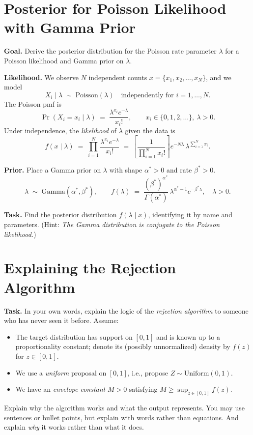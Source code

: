 \documentclass[12pt]{article}
\begin{document}
\section*{Posterior for Poisson Likelihood with Gamma Prior}

\textbf{Goal.} Derive the posterior distribution for the Poisson rate parameter $\lambda$ for a Poisson likelihood and Gamma prior on $\lambda$.

\textbf{Likelihood.} We observe $N$ independent counts $x = \{x_1, x_2, \dots, x_N\}$, and we model
\[
X_i \mid \lambda \;\sim\; \text{Poisson}(\lambda)\quad\text{independently for }i=1,\dots,N.
\]
The Poisson pmf is
\[
\Pr(X_i = x_i \mid \lambda) \;=\; \frac{\lambda^{x_i} e^{-\lambda}}{x_i!},\qquad x_i \in \{0,1,2,\dots\},\ \lambda>0.
\]
Under independence, the \emph{likelihood} of $\lambda$ given the data is
\[
f(x \mid \lambda)\;=\;\prod_{i=1}^N \frac{\lambda^{x_i} e^{-\lambda}}{x_i!}
\;=\; \left[\frac{1}{\prod_{i=1}^N x_i!}\right] e^{-N\lambda}\,\lambda^{\sum_{i=1}^N x_i}.
\]

\textbf{Prior.} Place a Gamma prior on $\lambda$ with shape $\alpha^*>0$ and rate $\beta^*>0$.
\[
\lambda \;\sim\; \text{Gamma}(\alpha^*, \beta^*),\qquad
f(\lambda) \;=\; \frac{(\beta^*)^{\alpha^*}}{\Gamma(\alpha^*)}\,\lambda^{\alpha^*-1} e^{-\beta^* \lambda},\quad \lambda>0.
\]

\textbf{Task.} Find the posterior distribution $f(\lambda \mid x)$, identifying it by name and parameters. (Hint: \textit{The Gamma distribution is conjugate to the Poisson likelihood.})

\newpage

\section*{Explaining the Rejection Algorithm}

\textbf{Task.} In your own words, explain the logic of the \emph{rejection algorithm} to someone who has never seen it before. Assume:
\begin{itemize}
\item The target distribution has support on $[0,1]$ and is known up to a proportionality constant; denote its (possibly unnormalized) density by $f(z)$ for $z \in [0,1]$.
\item We use a \emph{uniform} proposal on $[0,1]$, i.e., propose $Z \sim \text{Uniform}(0,1)$.
\item We have an \emph{envelope constant} $M>0$ satisfying $M \ge \sup_{z\in[0,1]} f(z)$.
\end{itemize}
Explain why the algorithm works and what the output represents. You may use sentences or bullet points, but explain with words rather than equations. And explain \textit{why} it works rather than what it does.
\end{document}
